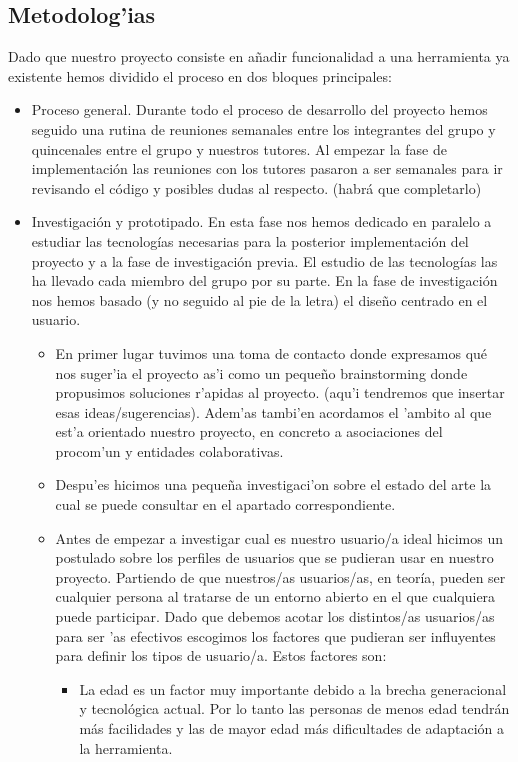 \documentclass{article}
\begin{document}
	\subsection{Metodolog'ias}
	Dado que nuestro proyecto consiste en añadir funcionalidad a una herramienta ya existente hemos dividido el proceso en dos bloques principales:
		\begin{itemize}
			\item Proceso general. Durante todo el proceso de desarrollo del proyecto hemos seguido una rutina de reuniones semanales entre los integrantes del grupo y quincenales entre el grupo y nuestros tutores. Al empezar la fase de implementación las reuniones con los tutores pasaron a ser semanales para ir revisando el código y posibles dudas al respecto. (habrá que completarlo)
			\item Investigación y prototipado. En esta fase nos hemos dedicado en paralelo a estudiar las tecnologías necesarias para la posterior implementación del proyecto y a la fase de investigación previa. El estudio de las tecnologías las ha llevado cada miembro del grupo por su parte.
			En la fase de investigación nos hemos basado (y no seguido al pie de la letra) el diseño centrado en el usuario.
			\begin{itemize}
				\item En primer lugar tuvimos una toma de contacto donde expresamos qué nos suger'ia el proyecto as'i como un pequeño brainstorming donde propusimos soluciones r'apidas al proyecto. (aqu'i tendremos que insertar esas ideas/sugerencias). Adem'as tambi'en acordamos el 'ambito al que est'a orientado nuestro proyecto, en concreto a asociaciones del procom'un y entidades colaborativas.
				\item Despu'es hicimos una pequeña investigaci'on sobre el estado del arte la cual se puede consultar en el apartado correspondiente.
				\item Antes de empezar a investigar cual es nuestro usuario/a ideal hicimos un postulado sobre los perfiles de usuarios que se pudieran usar en nuestro proyecto. Partiendo de que nuestros/as usuarios/as, en teoría, pueden ser cualquier persona al tratarse de un entorno abierto en el que cualquiera puede participar. Dado que debemos acotar los distintos/as usuarios/as para ser 'as efectivos escogimos los factores que pudieran ser influyentes para definir los tipos de usuario/a. Estos factores son:
					\begin{itemize}
						\item La edad es un factor muy importante debido a la brecha generacional y tecnológica actual. Por lo tanto las personas de menos edad tendrán más facilidades y las de mayor edad más dificultades de adaptación a la herramienta.

\end{itemize}
\end{itemize}
\end{itemize}
\end{document}
